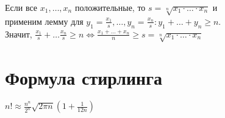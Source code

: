 \documentclass[letterpaper]{article}
\begin{document}
Если все \(x_1, \ldots, x_n\) положительные, то \(s = \sqrt[n]{x_1 \cdot \ldots \cdot x_n}\) и\\
применим лемму для \(y_1 = \frac{x_1}{s}, \ldots, y_n = \frac{x_n}{s}: y_1 + \ldots + y_n \geq n\).\\

Значит, \(\frac{x_1}{s} + \ldots \frac{x_n}{s} \geq n \iff \frac{x_1 + \ldots + x_n}{n} \geq s = \sqrt[n]{x_1 \cdot \ldots \cdot x_n}\)\\
\section{Формула стирлинга}
\label{sec:orgd18a4b3}
\(n! \approx \frac{n^n}{2^n} \sqrt{2 \pi n} (1 + \frac{1}{12n})\)\\
\end{document}
